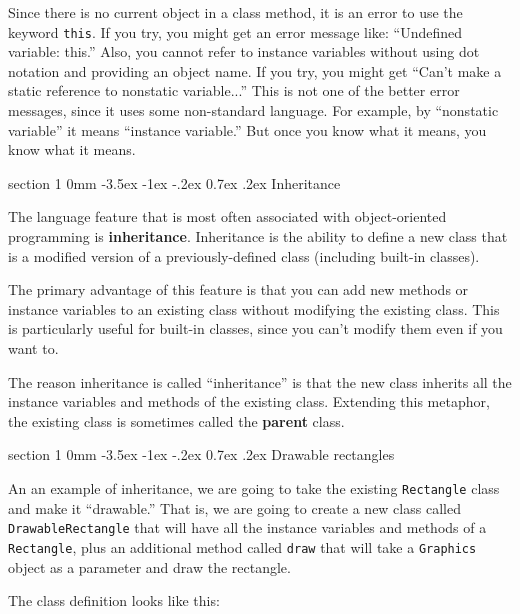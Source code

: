 \documentclass{book}
\makeatletter
\renewcommand{\section}{\@startsection 
    {section} {1} {0mm}%
    {-3.5ex \@plus -1ex \@minus -.2ex}%
    {0.7ex \@plus.2ex}%
    {\normalfont\Large\bfseries}}
\makeatother
\begin{document}

Since there is no current object in a class method, it is an
error to use the keyword {\tt this}.  If you try, you might get
an error message like: ``Undefined variable: this.''  Also, you
cannot refer to instance variables without using dot notation
and providing an object name.  If you try, you might get 
``Can't make a static reference to nonstatic variable...''
This is not one of the better error messages, since it uses
some non-standard language.  For example, by ``nonstatic
variable'' it means ``instance variable.''  But once you know
what it means, you know what it means.


\section{Inheritance}

The language feature that is most often associated with
object-oriented programming is {\bf inheritance}.  Inheritance is the
ability to define a new class that is a modified version of a
previously-defined class (including built-in classes).

The primary advantage of this feature is that you can add new methods
or instance variables to an existing class without modifying the
existing class.  This is particularly useful for built-in classes,
since you can't modify them even if you want to.

The reason inheritance is called ``inheritance'' is that the
new class inherits all the instance variables and methods
of the existing class.  Extending this metaphor, the existing
class is sometimes called the {\bf parent} class.


\section{Drawable rectangles}

An an example of inheritance, we are going to take the existing
{\tt Rectangle} class and make it ``drawable.''  That is, we are going to
create a new class called {\tt DrawableRectangle} that will have all
the instance variables and methods of a {\tt Rectangle}, plus an
additional method called {\tt draw} that will take a {\tt Graphics}
object as a parameter and draw the rectangle.

The class definition looks like this:
\end{document}
